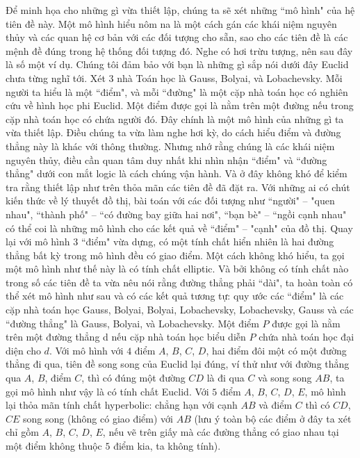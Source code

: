 \begin{multicols}{2}
	\vskip 0.1cm
	Để minh họa cho những gì vừa thiết lập, chúng ta sẽ xét những ``mô hình" của hệ tiên đề này. Một mô hình hiểu nôm na là một cách gán các khái niệm nguyên thủy và các quan hệ cơ bản với các đối tượng cho sẵn, sao cho các tiên đề là các mệnh đề đúng trong hệ thống đối tượng đó. Nghe có hơi trừu tượng, nên sau đây là số một ví dụ.
	\vskip 0.1cm
	Chúng tôi đảm bảo với bạn là những gì sắp nói dưới đây Euclid chưa từng nghĩ tới. Xét $3$ nhà Toán học là Gauss, Bolyai, và Lobachevsky. Mỗi người ta hiểu là một ``điểm", và mỗi ``đường" là một cặp nhà toán học có nghiên cứu về hình học phi Euclid. Một điểm được gọi là nằm trên một đường nếu trong cặp nhà toán học có chứa người đó. Đây chính là một mô hình của những gì ta vừa thiết lập.
	Điều chúng ta vừa làm nghe hơi kỳ, do cách hiểu điểm và đường thẳng này là khác với thông thường. Nhưng nhớ rằng chúng là các khái niệm nguyên thủy, điều cần quan tâm duy nhất khi nhìn nhận ``điểm" và ``đường thẳng" dưới con mắt logic là cách chúng vận hành. Và ở đây không khó để kiểm tra rằng thiết lập như trên thỏa mãn các tiên đề đã đặt ra. Với những ai có chút kiến thức về lý thuyết đồ thị, bài toán với các đối tượng như ``người" -- "quen nhau", ``thành phố" -- ``có đường bay giữa hai nơi", ``bạn bè" -- ``ngồi cạnh nhau" có thể coi là những mô hình cho các kết quả về ``điểm" -- "cạnh" của đồ thị. 
	Quay lại với mô hình $3$ ``điểm" vừa dựng, có một tính chất hiển nhiên là hai đường thẳng bất kỳ trong mô hình đều có giao điểm. Một cách không khó hiểu, ta gọi một mô hình như thế này là có tính chất elliptic.
	Và bởi không có tính chất nào trong số các tiên đề ta vừa nêu nói rằng đường thẳng phải ``dài", ta hoàn toàn có thể xét mô hình như sau và có các kết quả tương tự: quy ước các ``điểm" là các cặp nhà toán học {Gauss, Bolyai}, {Bolyai, Lobachevsky}, {Lobachevsky, Gauss} và các ``đường thẳng" là Gauss, Bolyai, và Lobachevsky. Một điểm $P$ được gọi là nằm trên một đường thẳng d nếu cặp nhà toán học biểu diễn $P$ chứa nhà toán học đại diện cho $d$. 
	\vskip 0.1cm
	Với mô hình với $4$ điểm $A$, $B$, $C$, $D$, hai điểm đôi một có một đường thẳng đi qua, tiên đề song song của Euclid lại đúng, ví thử như với đường thẳng qua $A$, $B$, điểm $C$, thì có đúng một đường $CD$ là đi qua $C$ và song song $AB$, ta gọi mô hình như vậy là có tính chất Euclid. Với $5$ điểm $A$, $B$, $C$, $D$, $E$, mô hình lại thỏa mãn tính chất hyperbolic: chẳng hạn với cạnh $AB$ và điểm $C$ thì có $CD$, $CE$ song song (không có giao điểm) với $AB$ (lưu ý toàn bộ các điểm ở đây ta xét chỉ gồm $A$, $B$, $C$, $D$, $E$, nếu vẽ trên giấy mà các đường thẳng có giao nhau tại một điểm không thuộc $5$ điểm kia, ta không tính).

\end{multicols}
